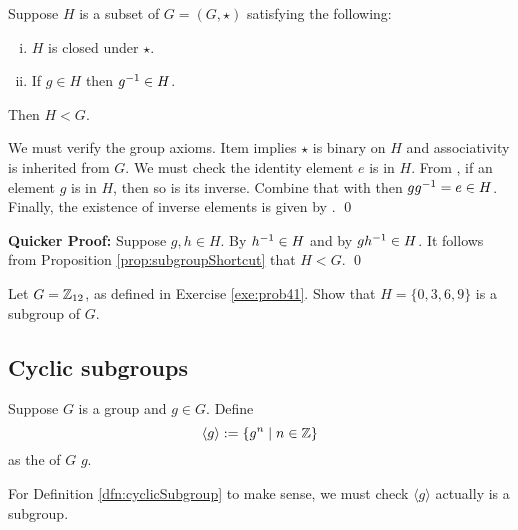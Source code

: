 \documentclass[../algebraNotesMSRI-UP2016.tex]{subfiles}
\begin{document}
\begin{frame}[c]
\begin{ex}[cf. Problem 49]\label{ex:prob49}
Suppose $H$ is a subset of $G=(G,\star)$ satisfying the following:
\begin{enumerate}[(i)]
\item\label{ex:prob49-1} $H$ is closed under $\star$.
\item\label{ex:prob49-2} If $g\in H$ then $g^{-1}\in H$.
\end{enumerate}
Then $H< G$.
\end{ex}

\smallGap
\pf
We must verify the group axioms.  Item  implies $\star$ is binary on $H$ and associativity is inherited from $G$.  We must check the identity element $e$ is in $H$.  From , if an element $g$ is in $H$, then so is its inverse.  Combine that with  then $gg^{-1}=e\in H$.  Finally, the existence of inverse elements is given by .
\qed

\smallGap
\textbf{Quicker Proof:} 
Suppose $g,h\in H$.  By  $h^{-1}\in H$ and by  $gh^{-1}\in H$.  It follows from Proposition \ref{prop:subgroupShortcut} that $H<G$.
\qed
\end{frame}

\begin{frame}[c]{}{}
\begin{exe}[cf. Problem 50]\label{exe:prob50}
Let $G=\mathbb Z_{12}$, as defined in Exercise \ref{exe:prob41}.  Show that $H=\{0,3,6,9\}$ is a subgroup of $G$.
\end{exe}
\end{frame}

\subsection[\subsecname]{Cyclic subgroups}\label{subsec:cyclic}
\begin{frame}[c]{\subsecname}
\begin{dfn}\label{dfn:cyclicSubgroup}
Suppose $G$ is a group and $g\in G$.  Define
\[
\langle g\rangle:=\{g^n\mid n\in\mathbb Z\}
\]
as the  of $G$  $g$.
\end{dfn}

\smallGap
\begin{exe}\label{exe:cyclicSubgroup}
For Definition \ref{dfn:cyclicSubgroup} to make sense, we must check $\langle g\rangle$ actually is a subgroup.  
\end{exe}
\end{frame}
\end{document}
